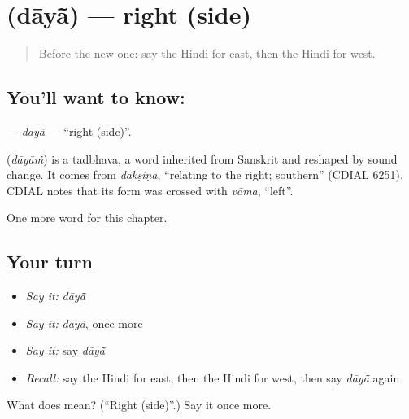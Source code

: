 \section[\texorpdfstring{\hi{दायाँ} (dāyā̃)}{दायाँ (dāyā̃)}]{ (dāyā̃) — right (side)}

\label{lesson:HI-C233-daya}



\begin{quote}
Before the new one: say the Hindi for east, then the Hindi for west.
\end{quote}

\subsection*{You'll want to know: }
\textbf{} — \emph{dāyā̃} — \textquotedblleft{}right (side)\textquotedblright{}.

\begin{cousinweb}
\textbf{} (\emph{dāyāṁ}) is a tadbhava, a word inherited from Sanskrit and reshaped by sound change. It comes from \emph{dākṣiṇa}, \textquotedblleft{}relating to the right; southern\textquotedblright{} (CDIAL 6251). CDIAL notes that its form was crossed with \emph{vāma}, \textquotedblleft{}left\textquotedblright{}.
\end{cousinweb}

\begin{grammarlens}[title={What you've built}]
One more word for this chapter.
\end{grammarlens}

\subsection*{Your turn}
\begin{itemize}
\raggedright
  \item \emph{Say it:} \emph{dāyā̃}
  \item \emph{Say it:} \emph{dāyā̃}, once more
  \item \emph{Say it:} say \emph{dāyā̃}
  \item \emph{Recall:} say the Hindi for east, then the Hindi for west, then say \emph{dāyā̃} again
\end{itemize}

\begin{tcolorbox}[breakable,colback=teal!4,colframe=teal!35!black,title={Before you move on}]
What does  mean? (\textquotedblleft{}Right (side)\textquotedblright{}.) Say it once more.
\end{tcolorbox}
